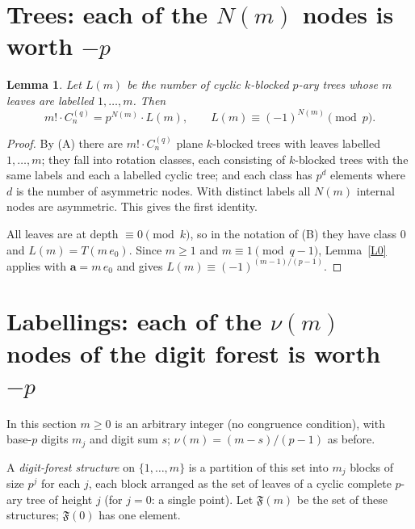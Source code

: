 \documentclass[11pt]{article}
\newtheorem{lemma}{Lemma}
\theoremstyle{remark}
\newcommand{\F}{\mathfrak F}
\newcommand{\C}{C_n^{(q)}}
\begin{document}
\section{Trees: each of the $N(m)$ nodes is worth $-p$}

\begin{lemma}\label{L1}
Let $L(m)$ be the number of cyclic $k$-blocked $p$-ary trees whose $m$ leaves are labelled
$1,\dots,m$. Then
\[
 m!\cdot\C=p^{N(m)}\cdot L(m),\qquad L(m)\equiv(-1)^{N(m)}\pmod p .
\]
\end{lemma}
\begin{proof}
By (A) there are $m!\cdot\C$ plane $k$-blocked trees with leaves labelled $1,\dots,m$; they
fall into rotation classes, each consisting of $k$-blocked trees with the same labels and each
a labelled cyclic tree; and each class has $p^{d}$ elements where $d$ is the number of
asymmetric nodes. With distinct labels all $N(m)$ internal nodes are asymmetric. This gives
the first identity.

All leaves are at depth $\equiv0\pmod k$, so in the notation of (B) they have class $0$ and
$L(m)=T(m\,e_0)$. Since $m\ge1$ and $m\equiv1\pmod{q-1}$, Lemma~\ref{L0} applies with
$\mathbf a=m\,e_0$ and gives $L(m)\equiv(-1)^{(m-1)/(p-1)}$.
\end{proof}

\section{Labellings: each of the $\nu(m)$ nodes of the digit forest is worth $-p$}

In this section $m\ge0$ is an arbitrary integer (no congruence condition), with base-$p$
digits $m_j$ and digit sum $s$; $\nu(m)=(m-s)/(p-1)$ as before.

A \emph{digit-forest structure} on $\{1,\dots,m\}$ is a partition of this set into $m_j$
blocks of size $p^j$ for each $j$, each block arranged as the set of leaves of a cyclic
complete $p$-ary tree of height $j$ (for $j=0$: a single point). Let $\F(m)$ be the set of
these structures; $\F(0)$ has one element.
\end{document}
